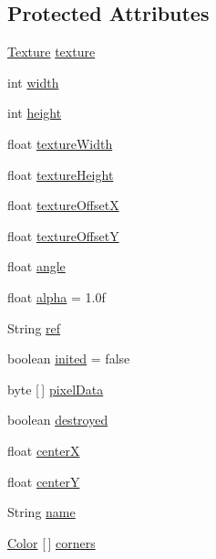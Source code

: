 \subsection*{Protected Attributes}
\begin{DoxyCompactItemize}
\item 
\mbox{\hyperlink{interfaceorg_1_1newdawn_1_1slick_1_1opengl_1_1_texture}{Texture}} \mbox{\hyperlink{classorg_1_1newdawn_1_1slick_1_1_image_a9fd9ddb21247305c83ac4e37d9d51f79}{texture}}
\item 
int \mbox{\hyperlink{classorg_1_1newdawn_1_1slick_1_1_image_a7d02c85e21b388428cfe5cc5c82714a1}{width}}
\item 
int \mbox{\hyperlink{classorg_1_1newdawn_1_1slick_1_1_image_a54397a37823bc59ddc79ec70dc5cf226}{height}}
\item 
float \mbox{\hyperlink{classorg_1_1newdawn_1_1slick_1_1_image_a0beda6fc601023aff97cce0d20d81f1e}{texture\+Width}}
\item 
float \mbox{\hyperlink{classorg_1_1newdawn_1_1slick_1_1_image_a048cc714a1282eac215dbe4e722a3146}{texture\+Height}}
\item 
float \mbox{\hyperlink{classorg_1_1newdawn_1_1slick_1_1_image_a0d11936067f8ad706c42a5feb411b5c8}{texture\+OffsetX}}
\item 
float \mbox{\hyperlink{classorg_1_1newdawn_1_1slick_1_1_image_a5c542a6d5fccbb7d56d74129b05cb78d}{texture\+OffsetY}}
\item 
float \mbox{\hyperlink{classorg_1_1newdawn_1_1slick_1_1_image_a4076b08a44e95eba2b65075342f16070}{angle}}
\item 
float \mbox{\hyperlink{classorg_1_1newdawn_1_1slick_1_1_image_a10f6c66f0f6ed78b3c1c05ac4f076dda}{alpha}} = 1.\+0f
\item 
String \mbox{\hyperlink{classorg_1_1newdawn_1_1slick_1_1_image_a32694687591a80299d8b8ad1ea070cee}{ref}}
\item 
boolean \mbox{\hyperlink{classorg_1_1newdawn_1_1slick_1_1_image_aa694324d7d8b46bbe65e066ca29cecfb}{inited}} = false
\item 
byte \mbox{[}$\,$\mbox{]} \mbox{\hyperlink{classorg_1_1newdawn_1_1slick_1_1_image_a9b5f82ff1c234a40d6c23ba2c82165f3}{pixel\+Data}}
\item 
boolean \mbox{\hyperlink{classorg_1_1newdawn_1_1slick_1_1_image_a1e070cb684b88b8c22db4063b8118dcd}{destroyed}}
\item 
float \mbox{\hyperlink{classorg_1_1newdawn_1_1slick_1_1_image_aef548becf8450e7173bbd8bded5b6b48}{centerX}}
\item 
float \mbox{\hyperlink{classorg_1_1newdawn_1_1slick_1_1_image_a3935c6eead627c8aa8667985fc314496}{centerY}}
\item 
String \mbox{\hyperlink{classorg_1_1newdawn_1_1slick_1_1_image_a6965c875dc3a3106ccbcc7a6b308c240}{name}}
\item 
\mbox{\hyperlink{classorg_1_1newdawn_1_1slick_1_1_color}{Color}} \mbox{[}$\,$\mbox{]} \mbox{\hyperlink{classorg_1_1newdawn_1_1slick_1_1_image_a3b6e6a11b3d871cf5677a561b19d9131}{corners}}
\end{DoxyCompactItemize}
